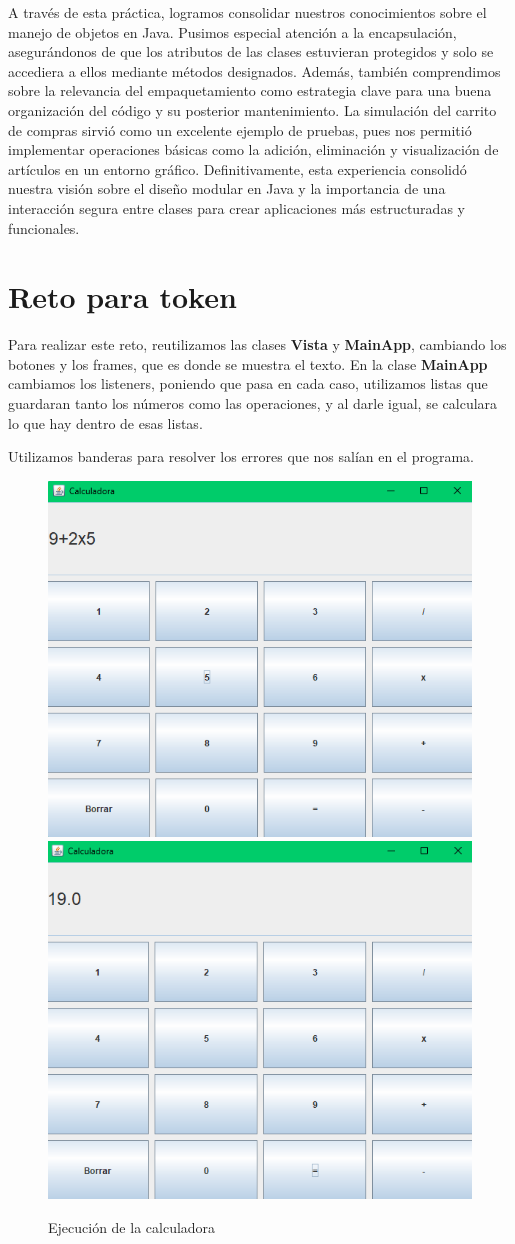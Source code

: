 \documentclass[letterpaper,12pt]{article}
\begin{document}
A través de esta práctica, logramos consolidar nuestros conocimientos sobre el manejo de objetos en Java. Pusimos especial atención a la encapsulación, asegurándonos de que los atributos de las clases estuvieran protegidos y solo se accediera a ellos mediante métodos designados. Además, también comprendimos sobre la relevancia del empaquetamiento como estrategia clave para una buena organización del código y su posterior mantenimiento. La simulación del carrito de compras sirvió como un excelente ejemplo de pruebas, pues nos permitió implementar operaciones básicas como la adición, eliminación y visualización de artículos en un entorno gráfico. Definitivamente, esta experiencia consolidó nuestra visión sobre el diseño modular en Java y la importancia de una interacción segura entre clases para crear aplicaciones más estructuradas y funcionales.

\printbibliography

\clearpage

\section{Reto para token}

Para realizar este reto, reutilizamos las clases \textbf{Vista} y \textbf{MainApp}, cambiando los botones y los frames, que es donde se muestra el texto. En la clase \textbf{MainApp} cambiamos los listeners, poniendo que pasa en cada caso, utilizamos listas que guardaran tanto los números como las operaciones, y al darle igual, se calculara lo que hay dentro de esas listas.

Utilizamos banderas para resolver los errores que nos salían en el programa.

\begin{figure}[H]
    \centering
    \includegraphics[width=0.4\linewidth]{Imagenes/calculadora1.png}
    \includegraphics[width=0.4\linewidth]{Imagenes/calculadora2.png}
    \caption*{Ejecución de la calculadora}
\end{figure}
\end{document}
